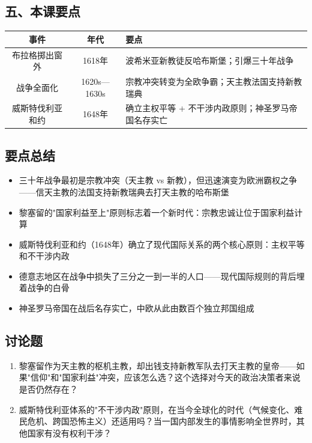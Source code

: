 \documentclass[a4paper,12pt]{ctexart}
\begin{document}
\subsection*{五、本课要点}

\begin{center}
\begin{tabular}{|c|c|p{7cm}|}
\hline
\textbf{事件} & \textbf{年代} & \textbf{要点} \\
\hline
布拉格掷出窗外 & 1618年 & 波希米亚新教徒反哈布斯堡；引爆三十年战争 \\
\hline
战争全面化 & 1620s—1630s & 宗教冲突转变为全欧争霸；天主教法国支持新教瑞典 \\
\hline
威斯特伐利亚和约 & 1648年 & 确立主权平等 + 不干涉内政原则；神圣罗马帝国名存实亡 \\
\hline
\end{tabular}
\end{center}

\subsection*{要点总结}
\begin{itemize}
  \item 三十年战争最初是宗教冲突（天主教 vs 新教），但迅速演变为欧洲霸权之争——信天主教的法国支持新教瑞典去打天主教的哈布斯堡
  \item 黎塞留的"国家利益至上"原则标志着一个新时代：宗教忠诚让位于国家利益计算
  \item 威斯特伐利亚和约（1648年）确立了现代国际关系的两个核心原则：主权平等和不干涉内政
  \item 德意志地区在战争中损失了三分之一到一半的人口——现代国际规则的背后埋着战争的白骨
  \item 神圣罗马帝国在战后名存实亡，中欧从此由数百个独立邦国组成
\end{itemize}

\subsection*{讨论题}
\begin{enumerate}
  \item 黎塞留作为天主教的枢机主教，却出钱支持新教军队去打天主教的皇帝——如果"信仰"和"国家利益"冲突，应该怎么选？这个选择对今天的政治决策者来说是否仍然存在？
  \item 威斯特伐利亚体系的"不干涉内政"原则，在当今全球化的时代（气候变化、难民危机、跨国恐怖主义）还适用吗？当一国内部发生的事情影响全世界时，其他国家有没有权利干涉？
\end{enumerate}
\end{document}
